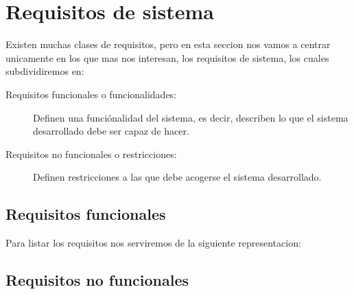 \chapter{Requisitos de sistema}

    Existen muchas clases de requisitos, pero en esta seccion nos vamos a centrar unicamente en los que mas nos interesan, los requisitos de sistema, los cuales subdividiremos en:
    \begin{description}
        \item[Requisitos funcionales o funcionalidades:]
            Definen una funciónalidad del sistema, es decir, describen lo que el sistema desarrollado debe ser capaz de hacer.
        \item[Requisitos no funcionales o restricciones:]
            Definen restricciones a las que debe acogerse el sistema desarrollado.
  
    \end{description}
  

\section{Requisitos funcionales}
    Para listar los requisitos nos serviremos de la siguiente representacion:
    
%    

\section{Requisitos no funcionales}
    

%    
